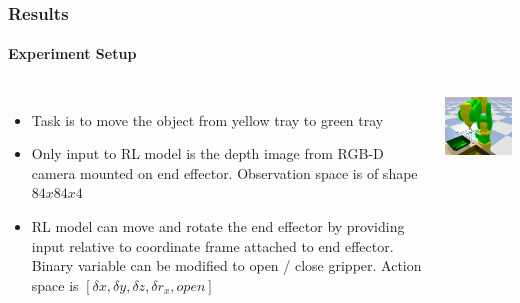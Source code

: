 \documentclass{beamer}
\begin{document}
	\begin{frame}
		\frametitle{Results}
		\framesubtitle{Experiment Setup}
		
		\begin{columns}[c]
			\begin{itemize}
				\item Task is to move the object from yellow tray to green tray
				\item Only input to RL model is the depth image from RGB-D camera mounted on end effector. Observation space is of shape $84x84x4$
				\item RL model can move and rotate the end effector by providing input relative to coordinate frame attached to end effector. Binary variable can be modified to open / close gripper. Action space is $[\delta x, \delta y, \delta z, \delta r_x, open]$
			\end{itemize}
			
			\includegraphics[width=6cm]{action-space.png}
		\end{columns}
	\end{frame}
\end{document}
